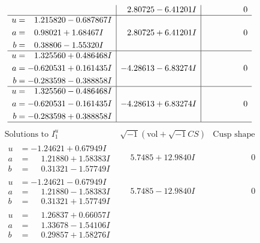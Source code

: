 \documentclass[1p]{elsarticle_modified}
\theoremstyle{definition}
\newcommand{\I}{\sqrt{-1}}
\begin{document}
$$\begin{array}{c|c|c}
 & \phantom{-}2.80725 - 6.41201 I & \phantom{-0.000000 } 0 \\ \hline\begin{aligned}
u &= \phantom{-}1.215820 - 0.687867 I \\
a &= \phantom{-}0.98021 + 1.68467 I \\
b &= \phantom{-}0.38806 - 1.55320 I\end{aligned}
 & \phantom{-}2.80725 + 6.41201 I & \phantom{-0.000000 } 0 \\ \hline\begin{aligned}
u &= \phantom{-}1.325560 + 0.486468 I \\
a &= -0.620531 + 0.161435 I \\
b &= -0.283598 - 0.388858 I\end{aligned}
 & -4.28613 - 6.83274 I & \phantom{-0.000000 } 0 \\ \hline\begin{aligned}
u &= \phantom{-}1.325560 - 0.486468 I \\
a &= -0.620531 - 0.161435 I \\
b &= -0.283598 + 0.388858 I\end{aligned}
 & -4.28613 + 6.83274 I & \phantom{-0.000000 } 0\\
 \hline 
 \end{array}$$\newpage$$\begin{array}{c|c|c}  
\text{Solutions to }I^u_{1}& \I (\text{vol} + \sqrt{-1}CS) & \text{Cusp shape}\\
 \hline 
\begin{aligned}
u &= -1.24621 + 0.67949 I \\
a &= \phantom{-}1.21880 + 1.58383 I \\
b &= \phantom{-}0.31321 - 1.57749 I\end{aligned}
 & \phantom{-}5.7485 + 12.9840 I & \phantom{-0.000000 } 0 \\ \hline\begin{aligned}
u &= -1.24621 - 0.67949 I \\
a &= \phantom{-}1.21880 - 1.58383 I \\
b &= \phantom{-}0.31321 + 1.57749 I\end{aligned}
 & \phantom{-}5.7485 - 12.9840 I & \phantom{-0.000000 } 0 \\ \hline\begin{aligned}
u &= \phantom{-}1.26837 + 0.66057 I \\
a &= \phantom{-}1.33678 - 1.54106 I \\
b &= \phantom{-}0.29857 + 1.58276 I\end{aligned}

\end{array}$$
\end{document}
